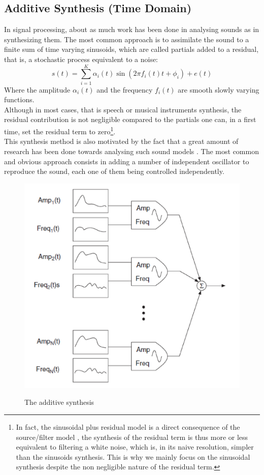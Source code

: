 \documentclass[]{article}
\begin{document}
\subsection{Additive Synthesis (Time Domain)}\label{sec:additive-synthesis-(time-domain)}
In signal processing, about as much work has been done in analysing sounds as in synthesizing them. The most common approach is to assimilate the sound to a finite sum of time varying sinusoids, which are called partials \cite{quatieri2002audio} added to a residual, that is, a stochastic process equivalent to a noise:
\begin{equation}
s(t) = \sum_{i=1}^{K}\alpha_i(t) \sin(2\pi f_i(t) t + \phi_{i}) + e(t)
\end{equation}
Where the amplitude $\alpha_i(t)$ and the frequency $f_i(t)$ are smooth slowly varying functions.\\
Although in most cases, that is speech or musical instruments synthesis, the residual contribution is not negligible compared to the partials \cite{quatieri2002audio, rodet1992spectral} one can, in a first time, set the residual term to zero\footnote{In fact, the sinusoidal plus residual model is a direct consequence of the source/filter model \cite{mcaulay1986speech}, the synthesis of the residual term is thus more or less equivalent to filtering a white noise, which is, in its naive resolution, simpler than the sinusoids synthesis. This is why we mainly focus on the sinusoidal synthesis despite the non negligible nature of the residual term.}.\\
This synthesis method is also motivated by the fact that a great amount of research has been done towards analysing such sound models \cite{rodet1992spectral, depalle1993tracking}. The most common and obvious approach consists in adding a number of independent oscillator to reproduce the sound, each one of them being controlled independently.
\begin{figure}[H]
	\centering
	{\includegraphics[scale=0.4]{additif.png}}
	\caption{The additive synthesis}
\end{figure} 
\end{document}
